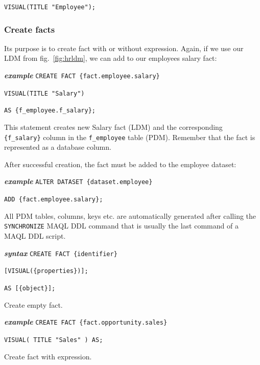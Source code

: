 \documentclass[a4paper, 12pt, titlepage, fleqn]{article}
\begin{document}
\hspace{2.5cm}\verb=VISUAL(TITLE "Employee");=

\subsubsection{Create facts}
Its purpose is to create fact with or without expression. Again, if we use our LDM from fig.~\ref{fig:hrldm}, we can add to our  employees salary fact:

\textbf{\emph{example}}  \hspace{.9cm}\verb=CREATE FACT {fact.employee.salary}=

\hspace{2.5cm}\verb=VISUAL(TITLE "Salary")=

\hspace{2.5cm}\verb=AS {f_employee.f_salary};=

This statement creates new Salary fact (LDM) and the corresponding \verb={f_salary}= column in the \verb=f_employee= table (PDM). Remember that the fact is represented as a database column.

After successful creation, the fact must be added to the employee dataset:

\textbf{\emph{example}}  \hspace{.9cm}\verb=ALTER DATASET {dataset.employee}=

\hspace{2.5cm}\verb=ADD {fact.employee.salary};=

All PDM tables, columns, keys etc. are automatically generated after calling the \verb=SYNCHRONIZE= MAQL DDL command that is usually the last command of a MAQL DDL script.

\textbf{\emph{syntax}}  \hspace{.9cm}\verb=CREATE FACT {identifier}=

\hspace{2.1cm}\verb=[VISUAL({properties})];=

\hspace{2.1cm}\verb=AS [{object}];=

\noindent Create empty fact.

\textbf{\emph{example}}  \hspace{.9cm}\verb=CREATE FACT {fact.opportunity.sales}=

\hspace{2.5cm}\verb=VISUAL( TITLE "Sales" ) AS;=

\noindent Create fact with expression.
\end{document}
